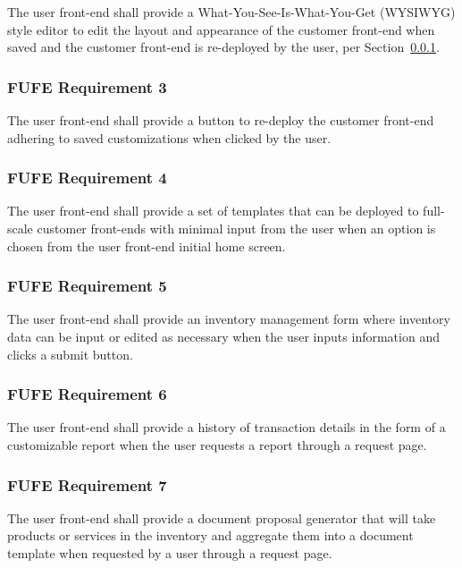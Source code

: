 \documentclass{article}
\begin{document}
The user front-end shall provide a What-You-See-Is-What-You-Get (WYSIWYG) style
editor to edit the layout and appearance of the customer front-end when saved
and the customer front-end is re-deployed by the user, per
Section~\ref{func-user-front-end-3}.

\subsubsection{FUFE Requirement 3}
\label{func-user-front-end-3}

The user front-end shall provide a button to re-deploy the customer front-end
adhering to saved customizations when clicked by the user.

\subsubsection{FUFE Requirement 4}
\label{func-user-front-end-4}

The user front-end shall provide a set of templates that can be deployed to
full-scale customer front-ends with minimal input from the user when an option
is chosen from the user front-end initial home screen.

\subsubsection{FUFE Requirement 5}
\label{func-user-front-end-5}

The user front-end shall provide an inventory management form where inventory
data can be input or edited as necessary when the user inputs information and
clicks a submit button.

\subsubsection{FUFE Requirement 6}
\label{func-user-front-end-6}

The user front-end shall provide a history of transaction details in the form
of a customizable report when the user requests a report through a request page.

\subsubsection{FUFE Requirement 7}
\label{func-user-front-end-7}

The user front-end shall provide a document proposal generator that will take
products or services in the inventory and aggregate them into a document
template when requested by a user through a request page.
\end{document}
